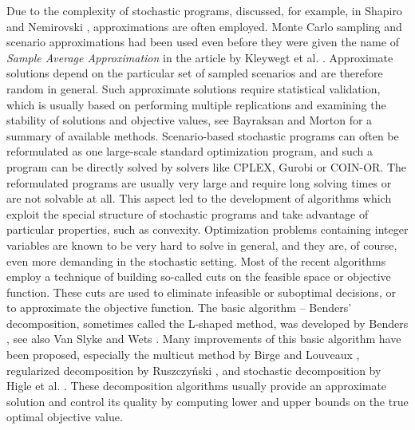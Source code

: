 \documentclass{article}              %
\begin{document}
Due to the complexity of stochastic programs,  discussed, for example, in Shapiro and Nemirovski \cite{complexity}, approximations are often employed. Monte Carlo sampling and scenario approximations had been used even before they were given the name of \emph{Sample Average Approximation} in the article by Kleywegt et al. \cite{saa}. Approximate solutions depend on the particular set of sampled scenarios and are therefore random in general. Such approximate solutions require statistical validation, which is usually based on performing multiple replications and examining the stability of solutions and objective values, see Bayraksan and Morton \cite{bayraksan_morton_2011} for a summary of available methods. Scenario-based stochastic programs can often be reformulated as one large-scale standard optimization program, and such a program can be directly solved by solvers like CPLEX, Gurobi or COIN-OR. The reformulated programs are usually very large and require long solving times or are not solvable at all. This aspect led to the development of algorithms which exploit the special structure of stochastic programs and take advantage of particular properties, such as convexity. Optimization problems containing integer variables are known to be very hard to solve in general, and they are, of course, even more demanding in the stochastic setting. Most of the recent algorithms employ a technique of building so-called cuts on the feasible space or objective function. These cuts are used to eliminate infeasible or suboptimal decisions, or to approximate the objective function. The basic algorithm -- Benders' decomposition, sometimes called the L-shaped method, was developed by Benders \cite{benders}, see also Van Slyke and Wets \cite{slyke_wets}. Many improvements of this basic algorithm have been proposed, especially the multicut method by Birge and Louveaux \cite{birge_multicut}, regularized decomposition by Ruszczy{\'n}ski \cite{regular_decomp}, and stochastic decomposition by Higle et al. \cite{stochdecomp_2stage}. These decomposition algorithms usually provide an approximate solution and control its quality by computing lower and upper bounds on the true optimal objective value.
\end{document}
